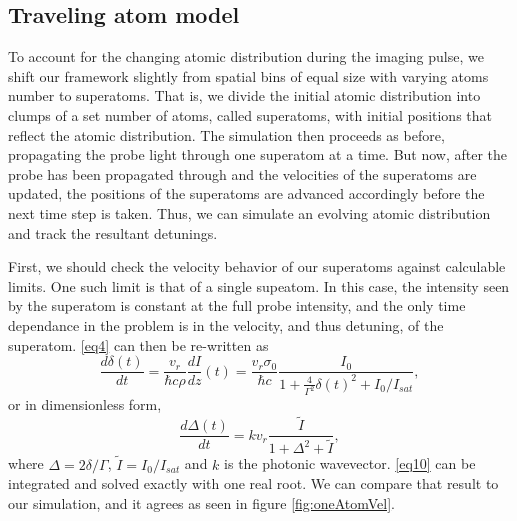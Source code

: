 \documentclass[12pt]{iopart}
\begin{document}
\subsection{Traveling atom model}
To account for the changing atomic distribution during the imaging pulse, we shift our framework slightly from spatial bins of equal size with varying atoms number to superatoms. That is, we divide the initial atomic distribution into clumps of a set number of atoms, called superatoms, with initial positions that reflect the atomic distribution. The simulation then proceeds as before, propagating the probe light through one superatom at a time. But now, after the probe has been propagated through and the velocities of the superatoms are updated, the positions of the superatoms are advanced accordingly before the next time step is taken. Thus, we can simulate an evolving atomic distribution and track the resultant detunings. 
\par First, we should check the velocity behavior of our superatoms against calculable limits. One such limit is that of a single supeatom. In this case, the intensity seen by the superatom is constant at the full probe intensity, and the only time dependance in the problem is in the velocity, and thus detuning, of the superatom. \ref{eq4} can then be re-written as
\begin{equation}
\frac{d\delta\left(t\right)}{dt}=\frac{v_r}{\hbar c \rho}\frac{dI}{dz}\left(t\right)=\frac{v_r \sigma_0}{\hbar c}\frac{I_0}{1+\frac{4}{\Gamma^2}\delta(t)^2 +I_0/I_{sat}},
\label{eq9}
\end{equation} 
or in dimensionless form,
\begin{equation}
\frac{d\Delta(t)}{dt}= k v_r \frac{\tilde{I}}{1+\Delta^2+\tilde{I}},
\label{eq10}
\end{equation}
where $\Delta = 2\delta/\Gamma$, $\tilde{I} = I_0/I_{sat}$ and $k$ is the photonic wavevector. \ref{eq10} can be integrated and solved exactly with one real root. We can compare that result to our simulation, and it agrees as seen in figure \ref{fig:oneAtomVel}.
\end{document}
